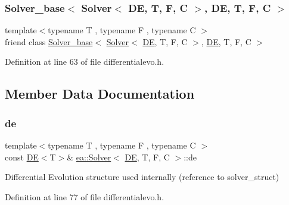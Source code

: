 \subsubsection{\texorpdfstring{Solver\+\_\+base$<$ Solver$<$ D\+E, T, F, C $>$, D\+E, T, F, C $>$}{Solver\_base< Solver< DE, T, F, C >, DE, T, F, C >}}
{\footnotesize\ttfamily template$<$typename T , typename F , typename C $>$ \\
friend class \hyperlink{classea_1_1_solver__base}{Solver\+\_\+base}$<$ \hyperlink{classea_1_1_solver}{Solver}$<$ \hyperlink{structea_1_1_d_e}{DE}, T, F, C $>$, \hyperlink{structea_1_1_d_e}{DE}, T, F, C $>$\hspace{0.3cm}{\ttfamily [friend]}}



Definition at line 63 of file differentialevo.\+h.



\subsection{Member Data Documentation}
\mbox{\label{classea_1_1_solver_3_01_d_e_00_01_t_00_01_f_00_01_c_01_4_a789b8665ce321248e3999907c37d0963}} 
\subsubsection{\texorpdfstring{de}{de}}
{\footnotesize\ttfamily template$<$typename T , typename F , typename C $>$ \\
const \hyperlink{structea_1_1_d_e}{DE}$<$T$>$\& \hyperlink{classea_1_1_solver}{ea\+::\+Solver}$<$ \hyperlink{structea_1_1_d_e}{DE}, T, F, C $>$\+::de\hspace{0.3cm}{\ttfamily [private]}}



Differential Evolution structure used internally (reference to solver\+\_\+struct) 



Definition at line 77 of file differentialevo.\+h.

\mbox{\label{classea_1_1_solver_3_01_d_e_00_01_t_00_01_f_00_01_c_01_4_a2f762378d566944899b2a07a5c74fc7f}} 
